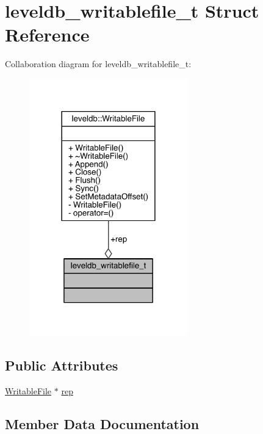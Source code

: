 \hypertarget{structleveldb__writablefile__t}{}\section{leveldb\+\_\+writablefile\+\_\+t Struct Reference}
\label{structleveldb__writablefile__t}


Collaboration diagram for leveldb\+\_\+writablefile\+\_\+t\+:\nopagebreak
\begin{figure}[H]
\begin{center}
\leavevmode
\includegraphics[width=194pt]{structleveldb__writablefile__t__coll__graph}
\end{center}
\end{figure}
\subsection*{Public Attributes}
\begin{DoxyCompactItemize}
\item 
\hyperlink{classleveldb_1_1_writable_file}{Writable\+File} $\ast$ \hyperlink{structleveldb__writablefile__t_a3cf7e2a9ac0560d667deee9d574d7761}{rep}
\end{DoxyCompactItemize}


\subsection{Member Data Documentation}
\hypertarget{structleveldb__writablefile__t_a3cf7e2a9ac0560d667deee9d574d7761}{}
